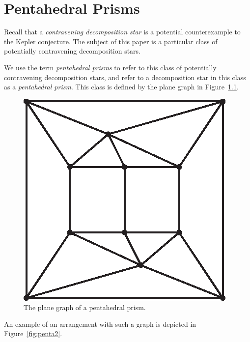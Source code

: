 

\chapter{Pentahedral Prisms}
Recall that a {\em contravening
decomposition star} is a potential counterexample to the
Kepler conjecture.  The subject of this paper is a particular class of potentially contravening
decomposition stars.

We use the term {\em pentahedral prisms} to refer to this class of potentially
contravening decomposition stars, and refer to a decomposition star in this
class as a {\em pentahedral prism}.  This class is defined by the plane graph in
Figure~\ref{fig:pentagraph}.

\begin{figure}
\begin{center}
\includegraphics{PS/pentagraph}
\end{center}
\caption{The plane graph of a pentahedral prism.}
\label{fig:pentagraph}
\end{figure}

An example of an arrangement with such a graph is depicted in Figure~\ref{fig:penta2}.

